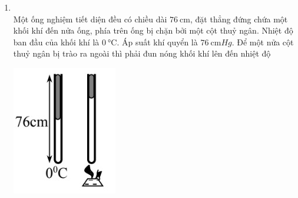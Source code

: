 \begin{enumerate}[label=\bfseries Câu \arabic*:, leftmargin=1.7cm]
\item{}\\
Một ống nghiệm tiết diện đều có chiều dài $\SI{76}{\centi\meter}$, đặt thẳng đứng chứa một khối khí đến nửa ống, phía trên ống bị chặn bởi một cột thuỷ ngân. Nhiệt độ ban đầu của khối khí là $\SI{0}{\celsius}$. Áp suất khí quyển là $\SI{76}{\centi\meter Hg}$. Để một nửa cột thuỷ ngân bị trào ra ngoài thì phải đun nóng khối khí lên đến nhiệt độ
\begin{center}
	\includegraphics[width=0.15\linewidth]{../figs/VN12-Y24-PH-SYL-012P-5}
\end{center}


\end{enumerate}
